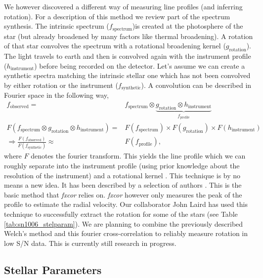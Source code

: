 We however discovered a different way of measuring line profiles (and inferring rotation). For a description of this method we review part of the spectrum synthesis. The intrinsic spectrum ($f_\textrm{spectrum}$)is created at the photosphere of the star (but already broadened by many factors like thermal broadening). A rotation of that star convolves the spectrum with a rotational broadening kernel ($g_\textrm{rotation}$). The light travels to earth and then is convolved again with the instrument profile ($h_\textrm{instrument}$) before being recorded on the detector.  Let's assume we can create a synthetic spectra matching the intrinsic stellar one which has not been convolved by either rotation or the instrument ($f_\textrm{synthetic}$). A convolution can be described in Fourier space in the following way,
\begin{align*}
	f_\textrm{observed} =& f_\textrm{spectrum} \otimes \underbrace{g_\textrm{rotation} \otimes h_\textrm{instrument}}_{f_\textrm{profile}}\\
     F(f_\textrm{spectrum} \otimes g_\textrm{rotation} \otimes h_\textrm{instrument}) =& F(f_\textrm{spectrum}) \times F(g_\textrm{rotation}) \times F(h_\textrm{instrument})\\
     \Rightarrow \frac{F(f_\textrm{observed})}{F(f_\textrm{synthetic})} \approx& F(f_\textrm{profile}),
\end{align*}
where $F$ denotes the fourier transform. This yields the line profile which we can roughly separate into the instrument profile (using prior knowledge about the resolution of the instrument) and a rotational kernel . This technique is by no means a new idea. It has been described by a selection of authors \citep[e.g.][]{1977ApJ...211..198G}. This is the basic method that \textit{fxcor} relies on. \textit{fxcor} however only measures the peak of the profile to estimate the radial velocity. Our collaborator John Laird has used this technique to successfully extract the rotation for some of the stars (see Table \ref{tab:sn1006_stelparam}). We are planning to combine the previously described Welch's method and this fourier cross-correlation to reliably measure rotation in low S/N data. This is currently still research in progress.



\subsection{Stellar Parameters}
\label{sec:sn1006_stelparam}

